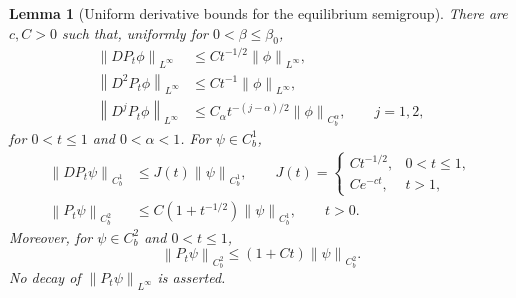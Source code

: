 \documentclass[11pt,reqno]{amsart}
\numberwithin{equation}{section}
\newtheorem{lemma}[lemma]{Lemma}
\theoremstyle{definition}
\theoremstyle{remark}
\newcommand{\norm}[1]{\left\lVert#1\right\rVert}
\begin{document}
\begin{lemma}[Uniform derivative bounds for the equilibrium semigroup]\label{lem:confined-semigroup}
There are $c,C>0$ such that, uniformly for $0<\beta\leq\beta_0$,
\begin{align}
 \norm{DP_t\phi}_{L^\infty}&\leq Ct^{-1/2}\norm\phi_{L^\infty},
 \label{eq:semigroup-gradient}\\
 \norm{D^2P_t\phi}_{L^\infty}&\leq Ct^{-1}\norm\phi_{L^\infty},
 \label{eq:semigroup-hessian}\\
 \norm{D^jP_t\phi}_{L^\infty}&\leq C_\alpha t^{-(j-\alpha)/2}
           \norm\phi_{C_b^\alpha},\qquad j=1,2,
 \label{eq:semigroup-holder}
\end{align}
for $0<t\leq1$ and $0<\alpha<1$. For $\psi\in C_b^1$,
\begin{align}
 \norm{DP_t\psi}_{C_b^1}&\leq J(t)\norm\psi_{C_b^1},
 \qquad
 J(t)=\begin{cases}Ct^{-1/2},&0<t\leq1,\\ Ce^{-ct},&t>1,
 \end{cases}
 \label{eq:semigroup-long-time}\\
 \norm{P_t\psi}_{C_b^2}&\leq C(1+t^{-1/2})\norm\psi_{C_b^1},
 \qquad t>0.
 \label{eq:semigroup-full-C2}
\end{align}
Moreover, for $\psi\in C_b^2$ and $0<t\leq1$,
\begin{equation}\label{eq:semigroup-right-upper}
 \norm{P_t\psi}_{C_b^2}\leq(1+Ct)\norm\psi_{C_b^2}.
\end{equation}
No decay of $\norm{P_t\psi}_{L^\infty}$ is asserted.
\end{lemma}
\end{document}
